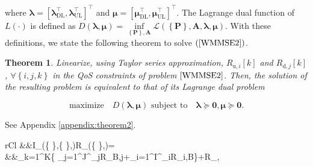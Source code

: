 \documentclass[10pt,journal]{IEEEtran}
\newcommand{\paren}[1]{\left({#1}\right)}
\newcommand{\bracket}[1]{{\left [{#1}\right ]}}
\newcommand{\braces}[1]{{\left\{ {#1}\right\}}}
\newcommand{\rr}{_\mathrm{r}}
\newcommand{\B}{\textrm{B}}
\newtheorem{theorem}{Theorem}
\theoremstyle{definition}
\begin{document}
	where $\boldsymbol{\lambda}=\bracket{\boldsymbol{\lambda}^\top_{\text{DL}},\boldsymbol{\lambda}^\top_{\text{UL}}}^\top$ and $\boldsymbol{\mu}=\bracket{\boldsymbol{\mu}^\top_{\text{DL}},\boldsymbol{\mu}^\top_{\text{UL}}}^\top$. The Lagrange dual function of $L\paren{\cdot}$ is defined as
	$D\paren{\boldsymbol{\lambda},\boldsymbol{\mu}}=\underset{\braces{\mathbf{P}},\mathbf{A}}\inf \mathcal{L}\paren{\braces{\mathbf{P}},\mathbf{A},\boldsymbol{\lambda},\boldsymbol{\mu}}$. %
	With these definitions, we state the following theorem to solve $\paren{\ref{WMMSE2}}$.
	\begin{theorem}\label{theorem: dual}
		Linearize, using Taylor series approximation, $R_{\textrm{u},i}\bracket{k}$ and $R_{\textrm{d},j}\bracket{k}$, $\forall\braces{i,j,k}$ in the QoS constraints of problem $\eqref{WMMSE2}$. Then, the solution of the resulting problem is equivalent to that of its Lagrange dual problem %
		\par\noindent\small
		\begin{equation}
			\label{dualproblem}
			\text{maximize} \quad D\paren{\boldsymbol{\lambda},\boldsymbol{\mu}}\text{  subject to}\quad  \boldsymbol{\lambda}  \succeq \mathbf{0}, \boldsymbol{\mu} \succeq \mathbf{0}.    
		\end{equation}

	\end{theorem}
	\begin{IEEEproof}
		See Appendix \ref{appendix:theorem2}.
	\end{IEEEproof}
	\iffalse
	\begin{IEEEeqnarray}{rCl}\label{objective2}
		&&I_{}\paren{\braces{},\braces{},}\triangleq R_{}\paren{\braces{},}=\nonumber\\
		&&\sum_{k=1}^K\braces{\sum_{j=1}^J\alpha^_jR_{\B,j}\bracket{k}+\sum_{i=1}^I\alpha^\text{u}_iR_{i,\B}\bracket{k}}+R\rr, \IEEEeqnarraynumspace	
	\end{IEEEeqnarray}	\normalsize
\end{document}
